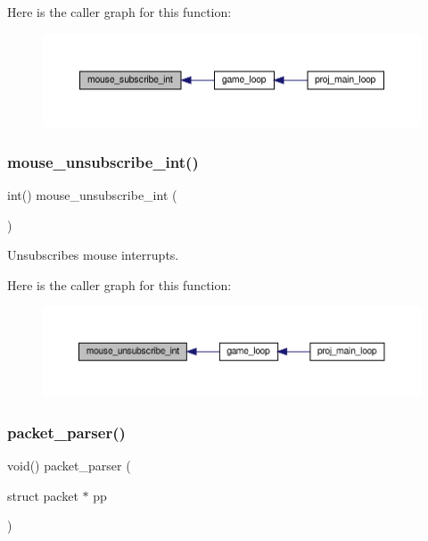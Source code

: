 Here is the caller graph for this function\+:
\nopagebreak
\begin{figure}[H]
\begin{center}
\leavevmode
\includegraphics[width=350pt]{group__mouse_ga20285aed4b3ef45812cd967532dd09db_icgraph}
\end{center}
\end{figure}
\mbox{\label{group__mouse_ga3ecf823d80520009ae5e0d76ae40a3c3}} 
\subsubsection{\texorpdfstring{mouse\+\_\+unsubscribe\+\_\+int()}{mouse\_unsubscribe\_int()}}
{\footnotesize\ttfamily int() mouse\+\_\+unsubscribe\+\_\+int (\begin{DoxyParamCaption}{ }\end{DoxyParamCaption})}



Unsubscribes mouse interrupts. 

Here is the caller graph for this function\+:
\nopagebreak
\begin{figure}[H]
\begin{center}
\leavevmode
\includegraphics[width=350pt]{group__mouse_ga3ecf823d80520009ae5e0d76ae40a3c3_icgraph}
\end{center}
\end{figure}
\mbox{\label{group__mouse_ga7a4689a8f91c2155ea5a1117721b86b9}} 
\subsubsection{\texorpdfstring{packet\+\_\+parser()}{packet\_parser()}}
{\footnotesize\ttfamily void() packet\+\_\+parser (\begin{DoxyParamCaption}\item[{struct packet $\ast$}]{pp }\end{DoxyParamCaption})}



